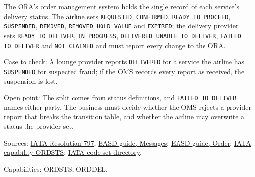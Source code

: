 
\begin{definition}
  \label{def:delivery-who-sets-status}
  \notready
  The ORA's order management system holds the single record of each
  service's delivery status. The airline sets \texttt{REQUESTED},
  \texttt{CONFIRMED}, \texttt{READY TO PROCEED}, \texttt{SUSPENDED},
  \texttt{REMOVED}, \texttt{REMOVED HOLD VALUE} and \texttt{EXPIRED}; the
  delivery provider sets \texttt{READY TO DELIVER}, \texttt{IN PROGRESS},
  \texttt{DELIVERED}, \texttt{UNABLE TO DELIVER}, \texttt{FAILED TO DELIVER}
  and \texttt{NOT CLAIMED} and must report every change to the ORA.

  Case to check: A lounge provider reports \texttt{DELIVERED} for a service
  the airline has \texttt{SUSPENDED} for suspected fraud; if the OMS records
  every report as received, the suspension is lost.

  Open point: The split comes from status definitions, and \texttt{FAILED TO
  DELIVER} names either party. The business must decide whether the OMS
  rejects a provider report that breaks the transition table, and whether
  the airline may overwrite a status the provider set.

  Sources: \href{https://www.iata.org/contentassets/72cbd60393ff42b5975d90ce9e049a7d/oneorder-resolution-797.pdf}{IATA Resolution 797};
  \href{https://standards.atlassian.net/wiki/spaces/EASD/pages/574652427/Messages}{EASD guide, Messages};
  \href{https://standards.atlassian.net/wiki/spaces/EASD/pages/574849062/Order}{EASD guide, Order};
  \href{https://retailing.iata.org/armi/docs/ORDSTS/}{IATA capability ORDSTS};
  \href{https://standards.atlassian.net/wiki/spaces/AIDM/pages/607420437/View+IATA+Codeset+Directory}{IATA code set directory}.

  Capabilities: ORDSTS, ORDDEL.
\end{definition}

